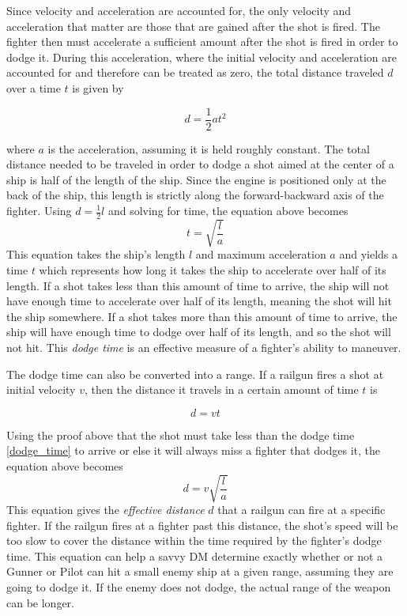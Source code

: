 \documentclass[a4paper]{article}
\begin{document}
Since velocity and acceleration are accounted for, the only velocity and acceleration that matter are those that are gained after the shot is fired. The fighter then must accelerate a sufficient amount after the shot is fired in order to dodge it. During this acceleration, where the initial velocity and acceleration are accounted for and therefore can be treated as zero, the total distance traveled $d$ over a time $t$ is given by 

\begin{equation} d = \frac{1}{2}at^2 \end{equation}

where $a$ is the acceleration, assuming it is held roughly constant. The total distance needed to be traveled in order to dodge a shot aimed at the center of a ship is half of the length of the ship. Since the engine is positioned only at the back of the ship, this length is strictly along the forward-backward axis of the fighter. Using $ d = \frac{1}{2} l $ and solving for time, the equation above becomes
\begin{equation} \label{dodge_time}
t = \sqrt{\frac{l}{a}}
\end{equation}
This equation takes the ship's length $l$ and maximum acceleration $a$ and yields a time $t$ which represents how long it takes the ship to accelerate over half of its length. If a shot takes less than this amount of time to arrive, the ship will not have enough time to accelerate over half of its length, meaning the shot will hit the ship somewhere. If a shot takes more than this amount of time to arrive, the ship will have enough time to dodge over half of its length, and so the shot will not hit. This \textit{dodge time} is an effective measure of a fighter's ability to maneuver. 

The dodge time can also be converted into a range. If a railgun fires a shot at initial velocity $v$, then the distance it travels in a certain amount of time $t$ is 

\begin{equation} d = vt \end{equation}

Using the proof above that the shot must take less than the dodge time \ref{dodge_time} to arrive or else it will always miss a fighter that dodges it, the equation above becomes 
\begin{equation} \label{effective_range}
d = v \sqrt{\frac{l}{a}}
\end{equation}
This equation gives the \textit{effective distance} $d$ that a railgun can fire at a specific fighter. If the railgun fires at a fighter past this distance, the shot's speed will be too slow to cover the distance within the time required by the fighter's dodge time. This equation can help a savvy DM determine exactly whether or not a Gunner or Pilot can hit a small enemy ship at a given range, assuming they are going to dodge it. If the enemy does not dodge, the actual range of the weapon can be longer.
\end{document}
